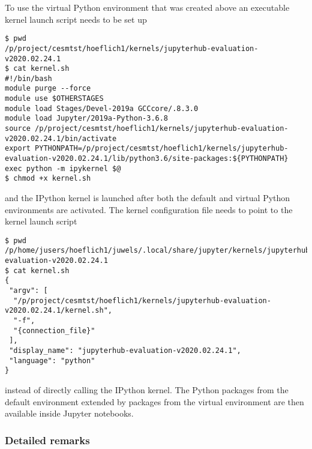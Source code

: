 To use the virtual Python environment that was created above an executable kernel launch script needs to be set up
%
\begin{verbatim}
$ pwd
/p/project/cesmtst/hoeflich1/kernels/jupyterhub-evaluation-v2020.02.24.1
$ cat kernel.sh
#!/bin/bash
module purge --force
module use $OTHERSTAGES
module load Stages/Devel-2019a GCCcore/.8.3.0
module load Jupyter/2019a-Python-3.6.8
source /p/project/cesmtst/hoeflich1/kernels/jupyterhub-evaluation-v2020.02.24.1/bin/activate
export PYTHONPATH=/p/project/cesmtst/hoeflich1/kernels/jupyterhub-evaluation-v2020.02.24.1/lib/python3.6/site-packages:${PYTHONPATH}
exec python -m ipykernel $@
$ chmod +x kernel.sh
\end{verbatim}
%
and the IPython kernel is launched after both the default and virtual Python environments are activated.
The kernel configuration file needs to point to the kernel launch script
%
\begin{verbatim}
$ pwd
/p/home/jusers/hoeflich1/juwels/.local/share/jupyter/kernels/jupyterhub-evaluation-v2020.02.24.1
$ cat kernel.sh
{
 "argv": [
  "/p/project/cesmtst/hoeflich1/kernels/jupyterhub-evaluation-v2020.02.24.1/kernel.sh",
  "-f",
  "{connection_file}"
 ],
 "display_name": "jupyterhub-evaluation-v2020.02.24.1",
 "language": "python"
}
\end{verbatim}
%
instead of directly calling the IPython kernel.
The Python packages from the default environment extended by packages from the virtual environment are then available inside Jupyter notebooks.

\subsubsection{Detailed remarks}

